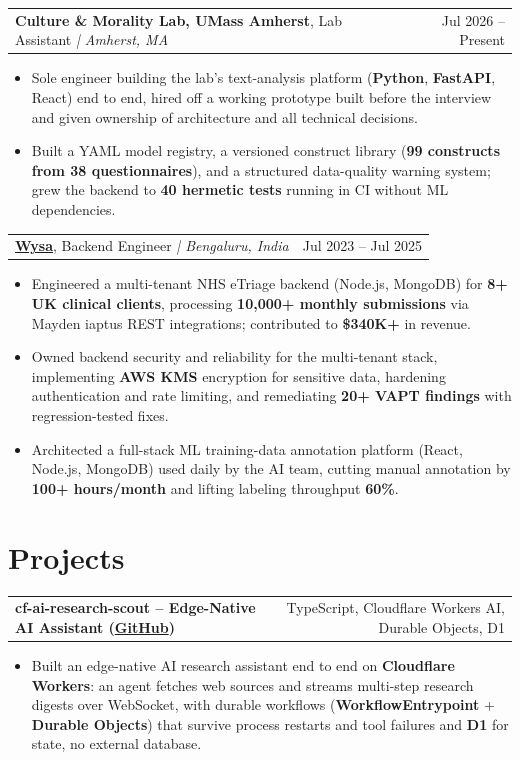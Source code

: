 \documentclass[letterpaper,11pt]{article}
\makeatletter
\newcommand{\expItem}[4]{%
  \vspace{2pt}
  \begin{tabular*}{\textwidth}{@{}l@{\extracolsep{\fill}}r@{}}
    \textbf{#1}, #2 \textit{| #3} & #4 \\
  \end{tabular*}\par\vspace{-3pt}
}
\newcommand{\projItem}[2]{%
  \vspace{2pt}
  \begin{tabular*}{\textwidth}{@{}l@{\extracolsep{\fill}}r@{}}
    \textbf{#1} & #2 \\
  \end{tabular*}\par\vspace{-3pt}
}
\makeatother
\begin{document}
\expItem{Culture \& Morality Lab, UMass Amherst}{Lab Assistant}{Amherst, MA}{Jul 2026 -- Present}
\begin{itemize}
  \item Sole engineer building the lab's text-analysis platform (\textbf{Python}, \textbf{FastAPI}, React) end to end, hired off a working prototype built before the interview and given ownership of architecture and all technical decisions.
  \item Built a YAML model registry, a versioned construct library (\textbf{99 constructs from 38 questionnaires}), and a structured data-quality warning system; grew the backend to \textbf{40 hermetic tests} running in CI without ML dependencies.
\end{itemize}

\expItem{\href{https://www.wysa.io}{Wysa}}{Backend Engineer}{Bengaluru, India}{Jul 2023 -- Jul 2025}
\begin{itemize}
  \item Engineered a multi-tenant NHS eTriage backend (Node.js, MongoDB) for \textbf{8+ UK clinical clients}, processing \textbf{10{,}000+ monthly submissions} via Mayden iaptus REST integrations; contributed to \textbf{\$340K+} in revenue.
  \item Owned backend security and reliability for the multi-tenant stack, implementing \textbf{AWS KMS} encryption for sensitive data, hardening authentication and rate limiting, and remediating \textbf{20+ VAPT findings} with regression-tested fixes.
  \item Architected a full-stack ML training-data annotation platform (React, Node.js, MongoDB) used daily by the AI team, cutting manual annotation by \textbf{100+ hours/month} and lifting labeling throughput \textbf{60\%}.
\end{itemize}

\section{Projects}

\projItem{cf-ai-research-scout -- Edge-Native AI Assistant {\normalfont\small(\href{https://github.com/Deva-1903/cf_ai_research_scout}{GitHub})}}{TypeScript, Cloudflare Workers AI, Durable Objects, D1}
\begin{itemize}
  \item Built an edge-native AI research assistant end to end on \textbf{Cloudflare Workers}: an agent fetches web sources and streams multi-step research digests over WebSocket, with durable workflows (\textbf{WorkflowEntrypoint} + \textbf{Durable Objects}) that survive process restarts and tool failures and \textbf{D1} for state, no external database.
\end{itemize}
\end{document}
